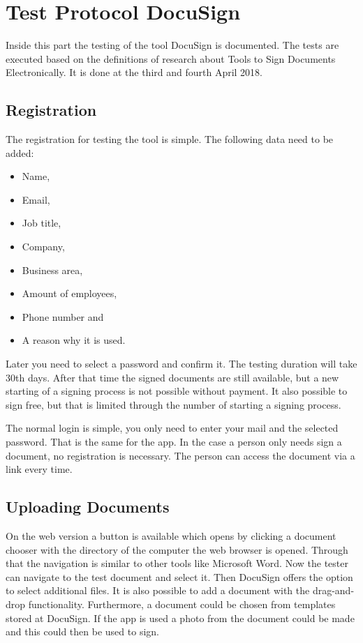 \section{Test Protocol DocuSign} \label{sec:docusign}
Inside this part the testing of the tool DocuSign is documented. The tests are executed based on the definitions of research about Tools to Sign Documents Electronically. It is done at the third and fourth April 2018. 

\subsection{Registration}
The registration for testing the tool is simple. The following data need to be added:
\begin{itemize}
	\item Name,
	\item Email,
	\item Job title,
	\item Company,
	\item Business area,
	\item Amount of employees,
	\item Phone number and
	\item A reason why it is used.
\end{itemize}
Later you need to select a password and confirm it. The testing duration will take 30th days. After that time the signed documents are still available, but a new starting of a signing process is not possible without payment. It also possible to sign free, but that is limited through the number of starting a signing process. 

The normal login is simple, you only need to enter your mail and the selected password. That is the same for the \gls{app}. In the case a person only needs sign a document, no registration is necessary. The person can access the document via a link every time.

\subsection{Uploading Documents}
On the web version a button is available which opens by clicking a document chooser with the directory of the computer the web browser is opened. Through that the navigation is similar to other tools like Microsoft Word. Now the tester can navigate to the test document and select it. Then DocuSign offers the option to select additional files. It is also possible to add a document with the drag-and-drop functionality. Furthermore, a document could be chosen from templates stored at DocuSign. If the \gls{app} is used a photo from the document could be made and this could then be used to sign.

